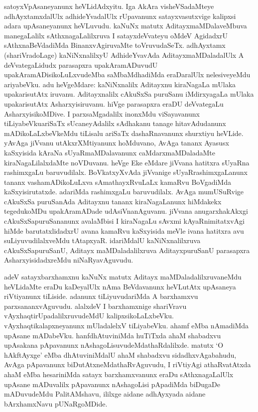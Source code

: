 
\begin{artha}
satoyxVpAsaneyanunx heVLidAdxyitu. Iga AkAra visheVSadaMteye adhAyxtamxdalUlx adhideYvadalUlx rUpavanunx satayxvasutxvige kalipxsi adara upAsaneyanunx heVLuvudu. kaNuNx matutx AditayxmaMDalaveMbuva manegaLalilx sAthxnagaLalilxruva I satayxdeVvateyu oMdeV AgidadxrU sAthxnaBeVdadiMda BinanxvAgiruvaMte toVruvudaSeTx. adhAyxtamx (shariVradoLage) kaNiNxnalilxyU AdhideYvavAda AditayxmaMDaladalUlx  A deVvategaLidudx parasapxra upakAramADuvudU upakAramADisikoLuLxvudeMba saMbaMdhadiMda eraDaralUlx nelesiveyeMdu ariyabeVku. adu heVgeMdare: kaNiNxnalilx Aditayxnu kiraNagaLa mUlaka upakarisutAtx iruvanu. Aditayxnalilx cAkuSxSa puruSanu iMdirxyagaLa mUlaka upakarisutAtx Asharxyisiruvanu. hiVge parasapxra eraDU deVvategaLu AsharxyisikoMDive. I parxsaMgadalilx inonxMdu viSayavanunx tiLiyabeVku\ndash  ariSaTx sUcaneyAdalilx sAdhakanu tanage hitavAdudanunx mADikoLaLxbeVkeMdu tiLisalu ariSaTx dashaRnavanunx shurxtiyu heVLide. yAvAga jiVvanu utAkxrXMtiyanunx hoMduvano, AvAga tananx Ayasusx kaSxyisida kAraNa sUyaRmaMDalavanunx caMdarxmaMDaladaMte kiraNagaLilalxdaMte noVDuvanu. heVge Eke eMdare jiVvana hatitxra sUyaRna rashimxgaLu baruvudilalx. BoVkatxyXvAda jiVvanige sUyaRrashimxgaLanunx tananx vashamADikoLuLxva sAmathayxRvuLaLx kamaRvu BoVgadiMda kaSxyisirutatxde. adariMda rashimxgaLu baruvudilalx. AvAga mumUSuRvige cAkuSxSa puruSanAda Aditayxnu tananx kiraNagaLanunx hiMdakekx tegedukoMDu upakAramADade udAsiVnanAguvanu. jiVvana anugarxhakAkxgi cAkuSxSapuruSananunx avalaMbisi I kiraNagaLu sAvxmi kAyaRnimitatxvAgi hiMde barutatxlidadxrU avana kamaRvu kaSxyisida meVle ivana hatitxra avu suLiyuvudilalxveMdu tAtapxyaR. idariMdalU kaNiNxnalilxruva cAkuSxSapuruSanU, Aditayx maMDaladalilxruva AditayxpuruSanU parasapxra AsharxyisidadxreMdu niNaRyavAguvudu. 
\end{artha}


\begin{artha}
adeV satayxbarxhamxnu kaNuNx matutx Aditayx maMDaladalilxruvaneMdu heVLidaMte eraDu kaDeyalUlx nAma BeVdavanunx heVLutAtx upAsaneya riVtiyanunx tiLiside. adanunx tiLiyuvudariMda A barxhamxvu parxsananxvAguvudu. alalxdeV I barxhamxnige shariVravu vAyxhaqtirUpadalilxruvudeMdU kalipxsikoLaLxbeVku. vAyxhaqtikalapxneyanunx mUladalelxV tiLiyabeVku. a{ha}mf eMba nAmadiMda upAsane mADabeVku. hanfdhAtuviniMda huTiTxda ahaM shabadxvu upAsakana pApavanunx nAshagoLisuvudeMdathaRdalilxde. matutx `O hAkftAyxge' eMba dhAtuviniMdalU ahaM shabadxvu sidadhxvAgabahudu, AvAga pApavanunx biDutAtxneMdathaRvAguvudu, I riVtiyAgi athaRvatAtxda ahaM eMba hesariniMda satayx barxhamxvanunx eraDu sAthxnagaLalUlx upAsane mADuvalilx pApavanunx nAshagoLisi pApadiMda biDugaDe mADuvudeMdu PalitAMshavu, ililxge aidane adhAyxyada aidane bArxhamxNavu pUNaRgoMDide.
\end{artha}

